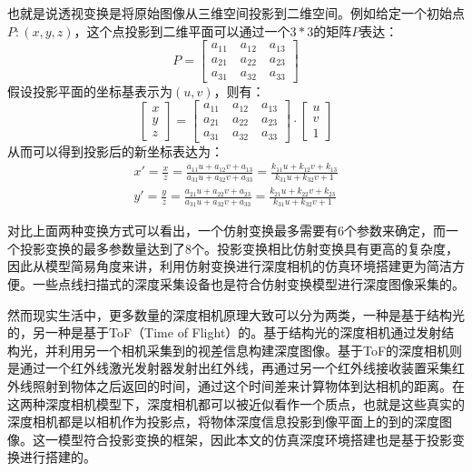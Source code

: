 也就是说透视变换是将原始图像从三维空间投影到二维空间。例如给定一个初始点$P:(x,y,z)$，这个点投影到二维平面可以通过一个$3*3$的矩阵$P$表达：
\begin{equation}
	P=
	\left[
	\begin{aligned}
	a_{11}\quad a_{12}\quad a_{13} \\
	a_{21}\quad a_{22}\quad a_{23} \\
	a_{31}\quad a_{32}\quad a_{33}
	\end{aligned}
	\right]
\end{equation}
假设投影平面的坐标基表示为$(u,v)$，则有：
\begin{equation}
	\left[
	\begin{aligned}
	x \\
	y \\
	z
	\end{aligned}
	\right]=
	\left[
	\begin{aligned}
	a_{11}\quad a_{12}\quad a_{13} \\
	a_{21}\quad a_{22}\quad a_{23} \\
	a_{31}\quad a_{32}\quad a_{33}
	\end{aligned}
	\right]\cdot
	\left[
	\begin{aligned}
	u \\
	v \\
	1
	\end{aligned}
	\right]
\end{equation}
从而可以得到投影后的新坐标表达为：
\begin{equation}
\begin{aligned}
	x'=\frac{x}{z}=\frac{a_{11}u+a_{12}v+a_{13}}{a_{31}u+a_{32}v+a_{33}}
		=\frac{k_{11}u+k_{12}v+k_{13}}{k_{31}u+k_{32}v+1} \\
	y'=\frac{y}{z}=\frac{a_{21}u+a_{22}v+a_{23}}{a_{31}u+a_{32}v+a_{33}}
		=\frac{k_{21}u+k_{22}v+k_{23}}{k_{31}u+k_{32}v+1}
\end{aligned}
\end{equation}

对比上面两种变换方式可以看出，一个仿射变换最多需要有6个参数来确定，而一个投影变换的最多参数量达到了8个。投影变换相比仿射变换具有更高的复杂度，因此从模型简易角度来讲，利用仿射变换进行深度相机的仿真环境搭建更为简洁方便。一些点线扫描式的深度采集设备也是符合仿射变换模型进行深度图像采集的。

然而现实生活中，更多数量的深度相机原理大致可以分为两类，一种是基于结构光的，另一种是基于ToF（Time of Flight）的。基于结构光的深度相机通过发射结构光，并利用另一个相机采集到的视差信息构建深度图像。基于ToF的深度相机则是通过一个红外线激光发射器发射出红外线，再通过另一个红外线接收装置采集红外线照射到物体之后返回的时间，通过这个时间差来计算物体到达相机的距离。在这两种深度相机模型下，深度相机都可以被近似看作一个质点，也就是这些真实的深度相机都是以相机作为投影点，将物体深度信息投影到像平面上的到的深度图像。这一模型符合投影变换的框架，因此本文的仿真深度环境搭建也是基于投影变换进行搭建的。

